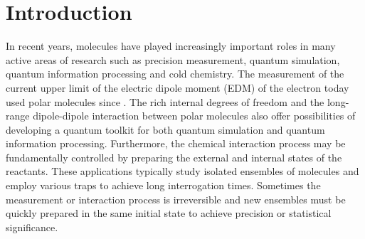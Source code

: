 \documentclass[twoside,twocolumn,9pt]{article}
\begin{document}
\section{Introduction}
In recent years, molecules have played increasingly important roles in many active areas of research such as precision measurement\cite{kobayashi2019measurement, andreev2018improved, biesheuvel2016probing}, quantum simulation\cite{ohmori2017special}, quantum information processing\cite{grandstrand:2004, soderberg2009ultracold} and cold chemistry\cite{balakrishnan2016perspective, bohn2017cold}.  The measurement of the current upper limit of the electric dipole moment (EDM) of the electron today used polar molecules\cite{andreev2018improved} since . The rich internal degrees of freedom and the long-range dipole-dipole interaction between polar molecules also offer possibilities of developing a quantum toolkit for both quantum simulation and quantum information processing\cite{wei2011entanglement}. Furthermore, the chemical interaction process may be fundamentally controlled by preparing the external and internal states of the reactants\cite{de2011controlling}. These applications typically study isolated ensembles of molecules and employ various traps to achieve long interrogation times. Sometimes the measurement or interaction process is irreversible and new ensembles must be quickly prepared in the same initial state to achieve precision or statistical significance. \par

\end{document}
